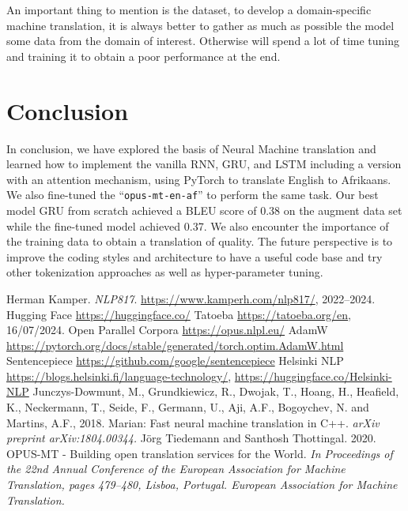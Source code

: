 An important thing to mention is the dataset, to develop a domain-specific machine translation, it is always better to gather as much as possible the model some data from the domain of interest. Otherwise will spend a lot of time tuning and training it to obtain a poor performance at the end.


\section{Conclusion}
In conclusion, we have explored the basis of Neural Machine translation and learned how to implement the vanilla RNN, GRU, and LSTM including a version with an attention mechanism, using PyTorch to translate English to Afrikaans. We also fine-tuned the ``\texttt{opus-mt-en-af}'' to perform the same task. Our best model GRU from scratch achieved a BLEU score of 0.38 on the augment data set while the fine-tuned model achieved 0.37. We also encounter the importance of the training data to obtain a translation of quality. The future perspective is to improve the coding styles and architecture to have a useful code base and try other tokenization approaches as well as hyper-parameter tuning.

\begin{thebibliography}{1}

	 Herman Kamper. \emph{NLP817}. \href{https://www.kamperh.com/nlp817/}{https://www.kamperh.com/nlp817/}, 2022--2024.
	 Hugging Face \href{https://huggingface.co/}{https://huggingface.co/}
	 Tatoeba \href{https://tatoeba.org/en}{https://tatoeba.org/en}, 16/07/2024.
	 Open Parallel Corpora \href{https://opus.nlpl.eu/}{https://opus.nlpl.eu/}
	 AdamW \href{https://pytorch.org/docs/stable/generated/torch.optim.AdamW.html}{https://pytorch.org/docs/stable/generated/torch.optim.AdamW.html}
	 Sentencepiece \href{https://github.com/google/sentencepiece}{https://github.com/google/sentencepiece}
	 Helsinki NLP \href{https://blogs.helsinki.fi/language-technology/}{https://blogs.helsinki.fi/language-technology/}, \href{https://huggingface.co/Helsinki-NLP}{https://huggingface.co/Helsinki-NLP}
	 Junczys-Dowmunt, M., Grundkiewicz, R., Dwojak, T., Hoang, H., Heafield, K., Neckermann, T., Seide, F., Germann, U., Aji, A.F., Bogoychev, N. and Martins, A.F., 2018. Marian: Fast neural machine translation in C++. \textit{arXiv preprint arXiv:1804.00344.}
	 Jörg Tiedemann and Santhosh Thottingal. 2020. OPUS-MT - Building open translation services for the World. \textit{In Proceedings of the 22nd Annual Conference of the European Association for Machine Translation, pages 479–480, Lisboa, Portugal. European Association for Machine Translation.}
\end{thebibliography}